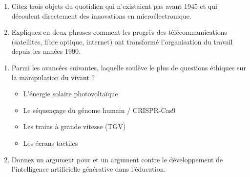 \documentclass[11pt]{article}
\begin{document}
\begin{exercice}
\begin{enumerate}
    \item Citez trois objets du quotidien qui n'existaient pas avant 1945 et qui découlent directement des innovations en microélectronique.
    \item Expliquez en deux phrases comment les progrès des télécommunications (satellites, fibre optique, internet) ont transformé l'organisation du travail depuis les années 1990.
\end{enumerate}
\end{exercice}

\begin{exercice}
\begin{enumerate}
    \item Parmi les avancées suivantes, laquelle soulève le plus de questions éthiques sur la manipulation du vivant ?
\begin{itemize}
        \item[$\square$] L'énergie solaire photovoltaïque
        \item[$\square$] Le séquençage du génome humain / CRISPR-Cas9
        \item[$\square$] Les trains à grande vitesse (TGV)
        \item[$\square$] Les écrans tactiles
    \end{itemize}
    \item Donnez un argument pour et un argument contre le développement de l'intelligence artificielle générative dans l'éducation.
\end{enumerate}
\end{exercice}
\end{document}
